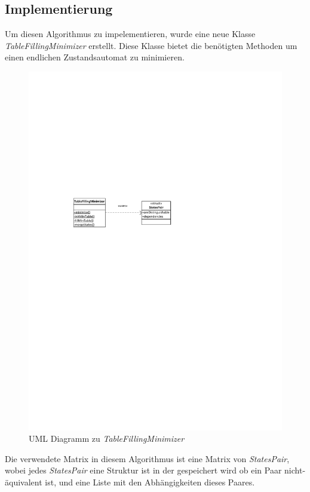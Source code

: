 \subsection{Implementierung}
\cite{minimization4,minimization5}
Um diesen Algorithmus zu impelementieren, wurde eine neue Klasse
\textit{TableFillingMinimizer} erstellt. Diese Klasse bietet die benötigten
Methoden um einen endlichen Zustandsautomat zu minimieren.

\begin{figure}[h]
  \begin{center}
  \includegraphics{objectsToInclude/TableFillingMinimizer.pdf}
  \caption{UML Diagramm zu \textit{TableFillingMinimizer}}
  \label{fig:UMLminTable}
  \end{center}
\end{figure}

Die verwendete Matrix in diesem Algorithmus ist eine Matrix von
\textit{StatesPair}, wobei jedes \textit{StatesPair} eine Struktur ist in der
gespeichert wird ob ein Paar nicht-äquivalent ist, und eine Liste mit den
Abhängigkeiten dieses Paares.